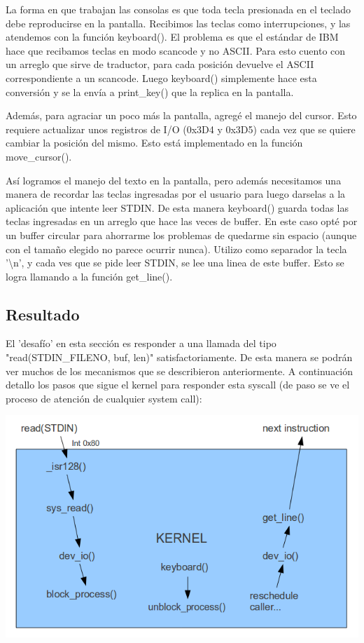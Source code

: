 La forma en que trabajan las consolas es que toda tecla presionada en el
teclado debe reproducirse en la pantalla. Recibimos las teclas como
interrupciones, y las atendemos con la función keyboard(). El problema es que el
estándar de IBM hace que recibamos teclas en modo scancode y no ASCII. Para
esto cuento con un arreglo que sirve de traductor, para cada posición devuelve
el ASCII correspondiente a un scancode. Luego keyboard() simplemente hace esta
conversión y se la envía a print\_key() que la replica en la pantalla.

Además, para agraciar un poco más la pantalla, agregé el manejo del cursor.
Esto requiere actualizar unos registros de I/O (0x3D4 y 0x3D5) cada vez que se
quiere cambiar la posición del mismo. Esto está implementado en la función
move\_cursor().

Así logramos el manejo del texto en la pantalla, pero además necesitamos una
manera de recordar las teclas ingresadas por el usuario para luego darselas a
la aplicación que intente leer STDIN. De esta manera keyboard() guarda todas
las teclas ingresadas en un arreglo que hace las veces de buffer. En este caso
opté por un buffer circular para ahorrarme los problemas de quedarme sin
espacio (aunque con el tamaño elegido no parece ocurrir nunca). Utilizo como
separador la tecla '\textbackslash n', y cada ves que se pide leer STDIN, se
lee una linea de este buffer. Esto se logra llamando a la función get\_line().

\subsection{Resultado}

El 'desafío' en esta sección es responder a una llamada del tipo
"read(STDIN\_FILENO, buf, len)" satisfactoriamente. De esta manera se podrán
ver muchos de los mecanismos que se describieron anteriormente. A continuación
detallo los pasos que sigue el kernel para responder esta syscall (de paso se
ve el proceso de atención de cualquier system call):


\begin{center}
\includegraphics[scale=0.5]{../img/syscall.png}
\end{center}


